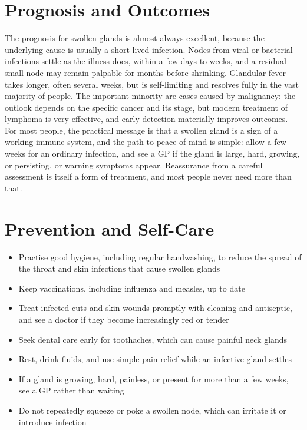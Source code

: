 \section*{Prognosis and Outcomes}
The prognosis for swollen glands is almost always excellent, because the underlying cause is usually a short-lived infection. Nodes from viral or bacterial infections settle as the illness does, within a few days to weeks, and a residual small node may remain palpable for months before shrinking. Glandular fever takes longer, often several weeks, but is self-limiting and resolves fully in the vast majority of people. The important minority are cases caused by malignancy: the outlook depends on the specific cancer and its stage, but modern treatment of lymphoma is very effective, and early detection materially improves outcomes. For most people, the practical message is that a swollen gland is a sign of a working immune system, and the path to peace of mind is simple: allow a few weeks for an ordinary infection, and see a GP if the gland is large, hard, growing, or persisting, or warning symptoms appear. Reassurance from a careful assessment is itself a form of treatment, and most people never need more than that.

\section*{Prevention and Self-Care}
\begin{itemize}
    \item Practise good hygiene, including regular handwashing, to reduce the spread of the throat and skin infections that cause swollen glands
    \item Keep vaccinations, including influenza and measles, up to date
    \item Treat infected cuts and skin wounds promptly with cleaning and antiseptic, and see a doctor if they become increasingly red or tender
    \item Seek dental care early for toothaches, which can cause painful neck glands
    \item Rest, drink fluids, and use simple pain relief while an infective gland settles
    \item If a gland is growing, hard, painless, or present for more than a few weeks, see a GP rather than waiting
    \item Do not repeatedly squeeze or poke a swollen node, which can irritate it or introduce infection
\end{itemize}


